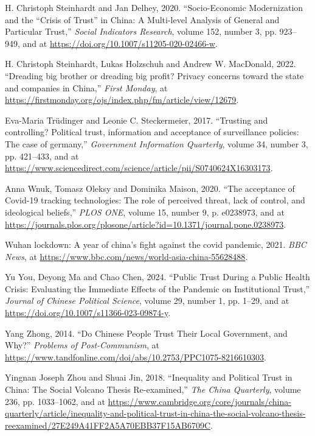 \documentclass[
  letterpaper,
  DIV=11,
  numbers=noendperiod]{scrartcl}
\newlength{\cslhangindent}
\newenvironment{CSLReferences}[2] %
 {\begin{list}{}{%
  \setlength{\itemindent}{0pt}
  \setlength{\leftmargin}{0pt}
  \setlength{\parsep}{0pt}
  \ifodd #1
   \setlength{\leftmargin}{\cslhangindent}
   \setlength{\itemindent}{-1\cslhangindent}
  \fi
  \setlength{\itemsep}{#2\baselineskip}}}
 {\end{list}}
\begin{document}
\begin{CSLReferences}{1}{1}
H. Christoph Steinhardt and Jan Delhey, 2020. {``Socio-Economic
Modernization and the {``}Crisis of Trust{''} in China: A Multi-level
Analysis of General and Particular Trust,''} \emph{Social Indicators
Research}, volume 152, number 3, pp. 923--949, and at
\url{https://doi.org/10.1007/s11205-020-02466-w}.

H. Christoph Steinhardt, Lukas Holzschuh and Andrew W. MacDonald, 2022.
{``Dreading big brother or dreading big profit? Privacy concerns toward
the state and companies in China,''} \emph{First Monday}, at
\url{https://firstmonday.org/ojs/index.php/fm/article/view/12679}.

Eva-Maria Trüdinger and Leonie C. Steckermeier, 2017. {``Trusting and
controlling? Political trust, information and acceptance of surveillance
policies: The case of germany,''} \emph{Government Information
Quarterly}, volume 34, number 3, pp. 421--433, and at
\url{https://www.sciencedirect.com/science/article/pii/S0740624X16303173}.

Anna Wnuk, Tomasz Oleksy and Dominika Maison, 2020. {``The acceptance of
Covid-19 tracking technologies: The role of perceived threat, lack of
control, and ideological beliefs,''} \emph{PLOS ONE}, volume 15, number
9, p. e0238973, and at
\url{https://journals.plos.org/plosone/article?id=10.1371/journal.pone.0238973}.

Wuhan lockdown: A year of china's fight against the covid pandemic,
2021. \emph{BBC News}, at
\url{https://www.bbc.com/news/world-asia-china-55628488}.

Yu You, Deyong Ma and Chao Chen, 2024. {``Public Trust During a Public
Health Crisis: Evaluating the Immediate Effects of the Pandemic on
Institutional Trust,''} \emph{Journal of Chinese Political Science},
volume 29, number 1, pp. 1--29, and at
\url{https://doi.org/10.1007/s11366-023-09874-y}.

Yang Zhong, 2014. {``Do Chinese People Trust Their Local Government, and
Why?''} \emph{Problems of Post-Communism}, at
\url{https://www.tandfonline.com/doi/abs/10.2753/PPC1075-8216610303}.

Yingnan Joseph Zhou and Shuai Jin, 2018. {``Inequality and Political
Trust in China: The Social Volcano Thesis Re-examined,''} \emph{The
China Quarterly}, volume 236, pp. 1033--1062, and at
\url{https://www.cambridge.org/core/journals/china-quarterly/article/inequality-and-political-trust-in-china-the-social-volcano-thesis-reexamined/27E249A41FF2A5A70EBB37F15AB6709C}.

\end{CSLReferences}
\end{document}
